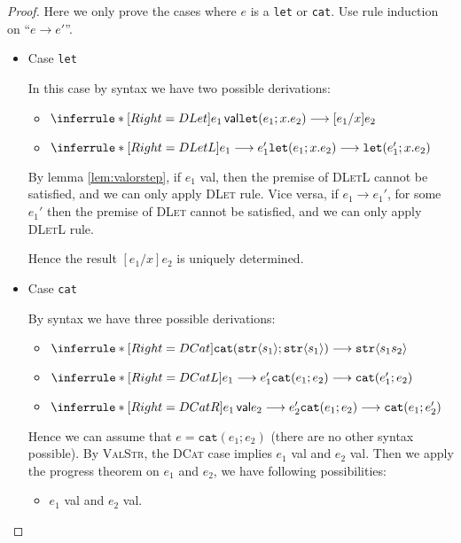 \documentclass{article}
\theoremstyle{definition}
\newcommand{\ip}[1]{\langle #1 \rangle}
\begin{document}
\begin{proof}
    Here we only prove the cases where $e$ is a \texttt{let} or \texttt{cat}.
    Use rule induction on ``$e\longrightarrow e'$''.

    \begin{itemize}
        \item Case \texttt{let}

              In this case by syntax we have two possible derivations:
              \begin{itemize}
                  \item $\inferrule*[Right=DLet]{e_1 \, \mathsf{val}}{\mathtt{let}(e_1;x.e_2) \longrightarrow [e_1/x]e_2}$
                  \item $\inferrule*[Right=DLetL]{e_1\longrightarrow e_1'}{\mathtt{let}(e_1;x.e_2) \longrightarrow \mathtt{let}(e_1';x.e_2)}$
              \end{itemize}
              By lemma \ref{lem:valorstep}, if $e_1$ \textsf{val}, then the premise of \textsc{DLetL} cannot be satisfied, and we can only apply \textsc{DLet} rule. Vice versa, if $e_1\longrightarrow e_1'$, for some $e_1'$ then the premise of \textsc{DLet} cannot be satisfied, and we can only apply \textsc{DLetL} rule.

              Hence the result $[e_1/x]e_2$ is uniquely determined.
        \item Case \texttt{cat}

              By syntax we have three possible derivations:
              \begin{itemize}
                  \item $\inferrule*[Right=DCat]{ }{\mathtt{cat}(\mathtt{str}\ip{s_1};\mathtt{str}\ip{s_1})\longrightarrow \mathtt{str}\ip{s_1s_2}}$

                  \item $\inferrule*[Right=DCatL]{e_1\longrightarrow e_1'}{\mathtt{cat}(e_1;e_2)\longrightarrow \mathtt{cat}(e_1';e_2)}$
                  \item $\inferrule*[Right=DCatR]{e_1\,\mathsf{val} \\ e_2\longrightarrow e_2'}{\mathtt{cat}(e_1;e_2)\longrightarrow \mathtt{cat}(e_1;e_2')}$
              \end{itemize}
              Hence we can assume that $e = \mathtt{cat}(e_1;e_2)$ (there are no other syntax possible).
              By \textsc{ValStr}, the \textsc{DCat} case implies $e_1$ \textsf{val} and $e_2$ \textsf{val}.
              Then we apply the progress theorem on $e_1$ and $e_2$, we have following possibilities:
              \begin{itemize}
                  \item $e_1$ \textsf{val} and $e_2$ \textsf{val}.


\end{itemize}
\end{itemize}
\end{proof}
\end{document}
